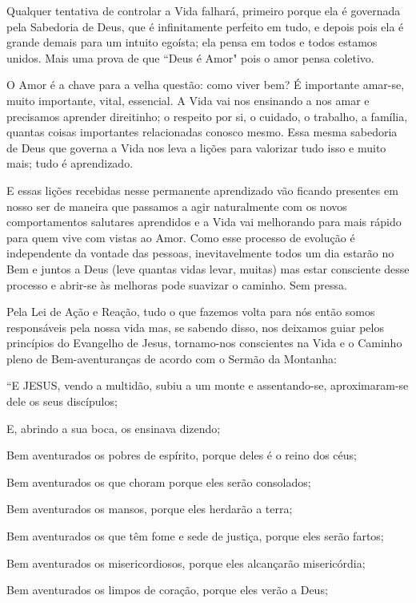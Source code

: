 \emdash{}Qualquer tentativa de controlar a Vida falhará, primeiro porque ela é governada pela Sabedoria de Deus, que é infinitamente perfeito em tudo, e depois pois ela é grande demais para um intuito egoísta; ela pensa em todos e todos estamos unidos. Mais uma prova de que ``Deus é Amor" pois o amor pensa coletivo.

\emdash{}O Amor é a chave para a velha questão: como viver bem? É importante amar-se, muito importante, vital, essencial. A Vida vai nos ensinando a nos amar e precisamos aprender direitinho; o respeito por si, o cuidado, o trabalho, a família, quantas coisas importantes relacionadas conosco mesmo. Essa mesma sabedoria de Deus que governa a Vida nos leva a lições para valorizar tudo isso e muito mais; tudo é aprendizado.

\emdash{}E essas lições recebidas nesse permanente aprendizado vão ficando presentes em nosso ser de maneira que passamos a agir naturalmente com os novos comportamentos salutares aprendidos e a Vida vai melhorando para mais rápido para quem vive com vistas ao Amor. Como esse processo de evolução é independente da vontade das pessoas, inevitavelmente todos um dia estarão no Bem e juntos a Deus (leve quantas vidas levar, muitas) mas estar consciente desse processo e abrir-se às melhoras pode suavizar o caminho. Sem pressa.

\emdash{}Pela Lei de Ação e Reação, tudo o que fazemos volta para nós então somos responsáveis pela nossa vida mas, se sabendo disso, nos deixamos guiar pelos princípios do Evangelho de Jesus, tornamo-nos conscientes na Vida e o Caminho pleno de Bem-aventuranças de acordo com o Sermão da Montanha:

\emdash{} ``E JESUS, vendo a multidão, subiu a um monte e assentando-se, aproximaram-se dele os seus discípulos;

\emdash{} E, abrindo a sua boca, os ensinava dizendo;

\emdash{} Bem aventurados os pobres de espírito, porque deles é o reino dos céus;

\emdash{} Bem aventurados os que choram porque eles serão consolados;

\emdash{} Bem aventurados os mansos, porque eles herdarão a terra;

\emdash{} Bem aventurados os que têm fome e sede de justiça, porque eles serão fartos;

\emdash{} Bem aventurados os misericordiosos, porque eles alcançarão misericórdia;

\emdash{} Bem aventurados os limpos de coração, porque eles verão a Deus;


